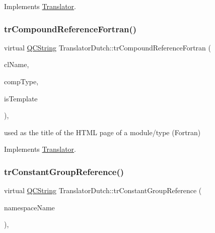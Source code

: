 Implements \mbox{\hyperlink{class_translator}{Translator}}.

\mbox{\label{class_translator_dutch_a80dda8a8d888ab1eb8dadc4670eb1d2a}} 
\subsubsection{\texorpdfstring{trCompoundReferenceFortran()}{trCompoundReferenceFortran()}}
{\footnotesize\ttfamily virtual \mbox{\hyperlink{class_q_c_string}{Q\+C\+String}} Translator\+Dutch\+::tr\+Compound\+Reference\+Fortran (\begin{DoxyParamCaption}\item[{const char $\ast$}]{cl\+Name,  }\item[{\mbox{\hyperlink{class_class_def_ae70cf86d35fe954a94c566fbcfc87939}{Class\+Def\+::\+Compound\+Type}}}]{comp\+Type,  }\item[{bool}]{is\+Template }\end{DoxyParamCaption})\hspace{0.3cm}{\ttfamily [inline]}, {\ttfamily [virtual]}}

used as the title of the H\+T\+ML page of a module/type (Fortran) 

Implements \mbox{\hyperlink{class_translator}{Translator}}.

\mbox{\label{class_translator_dutch_a5ef859a682ec4f68ebf0182386a94c81}} 
\subsubsection{\texorpdfstring{trConstantGroupReference()}{trConstantGroupReference()}}
{\footnotesize\ttfamily virtual \mbox{\hyperlink{class_q_c_string}{Q\+C\+String}} Translator\+Dutch\+::tr\+Constant\+Group\+Reference (\begin{DoxyParamCaption}\item[{const char $\ast$}]{namespace\+Name }\end{DoxyParamCaption})\hspace{0.3cm}{\ttfamily [inline]}, {\ttfamily [virtual]}}

